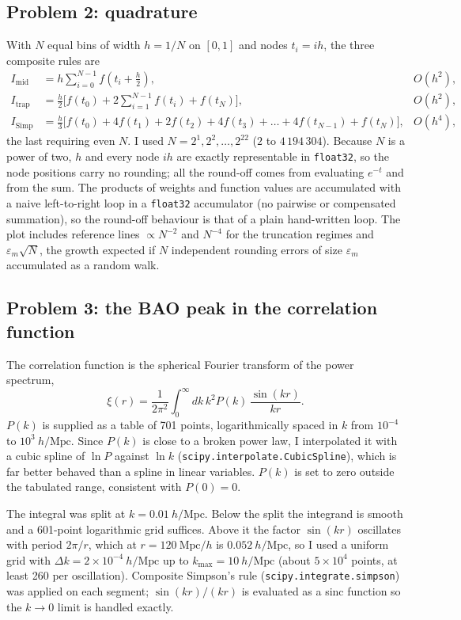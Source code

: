\documentclass[11pt]{article}
\newcommand{\epsm}{\varepsilon_m}
\newcommand{\code}[1]{\texttt{#1}}
\begin{document}
\subsection*{Problem 2: quadrature}

With $N$ equal bins of width $h=1/N$ on $[0,1]$ and nodes $t_i = ih$, the three
composite rules are
\begin{align*}
I_{\mathrm{mid}} &= h\sum_{i=0}^{N-1} f\!\left(t_i+\tfrac{h}{2}\right), & O(h^{2}),\\
I_{\mathrm{trap}} &= \frac{h}{2}\Big[f(t_0)+2\sum_{i=1}^{N-1}f(t_i)+f(t_N)\Big], & O(h^{2}),\\
I_{\mathrm{Simp}} &= \frac{h}{3}\Big[f(t_0)+4f(t_1)+2f(t_2)+4f(t_3)+\dots+4f(t_{N-1})+f(t_N)\Big], & O(h^{4}),
\end{align*}
the last requiring even $N$. I used $N = 2^{1},2^{2},\dots,2^{22}$
($2$ to $4\,194\,304$). Because $N$ is a power of two, $h$ and every node
$ih$ are exactly representable in \code{float32}, so the node positions carry no
rounding; all the round-off comes from evaluating $e^{-t}$ and from the sum. The
products of weights and function values are accumulated with a naive
left-to-right loop in a \code{float32} accumulator (no pairwise or compensated
summation), so the round-off behaviour is that of a plain hand-written loop.
The plot includes reference lines $\propto N^{-2}$ and $N^{-4}$ for the
truncation regimes and $\epsm\sqrt{N}$, the growth expected if $N$ independent
rounding errors of size $\epsm$ accumulated as a random walk.

\subsection*{Problem 3: the BAO peak in the correlation function}

The correlation function is the spherical Fourier transform of the power
spectrum,
\[
\xi(r) = \frac{1}{2\pi^{2}}\int_0^{\infty} dk\, k^{2} P(k)\,\frac{\sin(kr)}{kr}.
\]
$P(k)$ is supplied as a table of 701 points, logarithmically spaced in $k$ from
$10^{-4}$ to $10^{3}\ h/\mathrm{Mpc}$. Since $P(k)$ is close to a broken power
law, I interpolated it with a cubic spline of $\ln P$ against $\ln k$
(\code{scipy.interpolate.CubicSpline}), which is far better behaved than a spline
in linear variables. $P(k)$ is set to zero outside the tabulated range, consistent
with $P(0)=0$.

The integral was split at $k = 0.01\ h/\mathrm{Mpc}$. Below the split the
integrand is smooth and a 601-point logarithmic grid suffices. Above it the
factor $\sin(kr)$ oscillates with period $2\pi/r$, which at $r=120\ \mathrm{Mpc}/h$
is $0.052\ h/\mathrm{Mpc}$, so I used a uniform grid with
$\Delta k = 2\times10^{-4}\ h/\mathrm{Mpc}$ up to $k_{\max} = 10\ h/\mathrm{Mpc}$
(about $5\times10^{4}$ points, at least 260 per oscillation). Composite
Simpson's rule (\code{scipy.integrate.simpson}) was applied on each segment;
$\sin(kr)/(kr)$ is evaluated as a sinc function so the $k\to0$ limit is handled
exactly.
\end{document}
